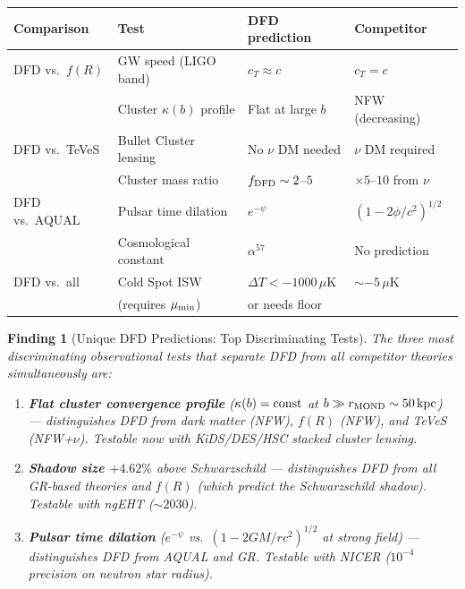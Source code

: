 \documentclass[11pt]{article}
\newtheorem{finding}{Finding}
\newcommand{\alphafine}{\alpha}
\newcommand{\mufd}{\mu}
\begin{document}
\begin{center}
\begin{tabular}{llll}
\toprule
Comparison & Test & DFD prediction & Competitor \\
\midrule
DFD vs.\ $f(R)$ & GW speed (LIGO band) & $c_T \approx c$ & $c_T = c$ \\
& Cluster $\kappa(b)$ profile & Flat at large $b$ & NFW (decreasing) \\
DFD vs.\ TeVeS & Bullet Cluster lensing & No $\nu$ DM needed & $\nu$ DM required \\
& Cluster mass ratio & $f_{\rm DFD} \sim 2$--$5$ & $\times 5$--$10$ from $\nu$ \\
DFD vs.\ AQUAL & Pulsar time dilation & $e^{-\psi}$ & $(1-2\phi/c^2)^{1/2}$ \\
& Cosmological constant & $\alphafine^{57}$ & No prediction \\
DFD vs.\ all & Cold Spot ISW & $\Delta T < -1000\,\mu$K & $\sim -5\,\mu$K \\
& (requires $\mufd_{\rm min}$) & or needs floor & \\
\bottomrule
\end{tabular}
\end{center}

\begin{finding}[Unique DFD Predictions: Top Discriminating Tests]
\label{find:discriminating}
The three most discriminating observational tests that separate DFD
from all competitor theories simultaneously are:
\begin{enumerate}[nosep]
  \item \textbf{Flat cluster convergence profile} ($\kappa(b) = {\rm const}$
    at $b \gg r_{\rm MOND} \sim 50\,{\rm kpc}$) --- distinguishes DFD
    from dark matter (NFW), $f(R)$ (NFW), and TeVeS (NFW+$\nu$).
    Testable now with KiDS/DES/HSC stacked cluster lensing.
  \item \textbf{Shadow size $+4.62\%$} above Schwarzschild ---
    distinguishes DFD from all GR-based theories and $f(R)$ (which
    predict the Schwarzschild shadow).  Testable with ngEHT ($\sim 2030$).
  \item \textbf{Pulsar time dilation} ($e^{-\psi}$ vs.\ $(1-2GM/rc^2)^{1/2}$
    at strong field) --- distinguishes DFD from AQUAL and GR.
    Testable with NICER ($10^{-4}$ precision on neutron star radius).
\end{enumerate}
\end{finding}

\end{document}
